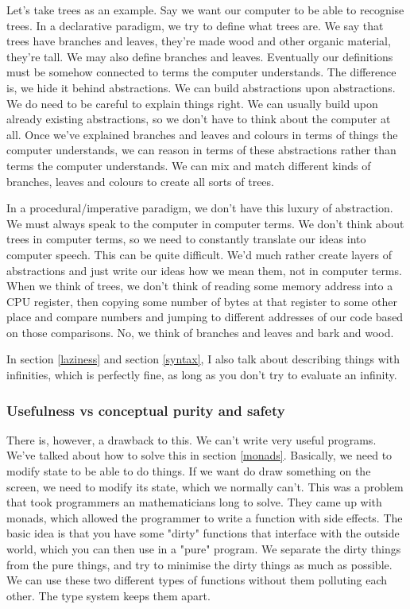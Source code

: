 \documentclass[11pt]{article}
\begin{document}
Let's take trees as an example. Say we want our computer to be able to
recognise trees. In a declarative paradigm, we try to define what trees are. We
say that trees have branches and leaves, they're made wood and other organic
material, they're tall. We may also define branches and leaves. Eventually our
definitions must be somehow connected to terms the computer understands. The
difference is, we hide it behind abstractions. We can build abstractions upon
abstractions. We do need to be careful to explain things right. We can usually
build upon already existing abstractions, so we don't have to think about the
computer at all. Once we've explained branches and leaves and colours in terms
of things the computer understands, we can reason in terms of these
abstractions rather than terms the computer understands. We can mix and match
different kinds of branches, leaves and colours to create all sorts of trees.

In a procedural/imperative paradigm, we don't have this luxury of abstraction.
We must always speak to the computer in computer terms. We don't think about
trees in computer terms, so we need to constantly translate our ideas into
computer speech. This can be quite difficult. We'd much rather create layers of
abstractions and just write our ideas how we mean them, not in computer terms.
When we think of trees, we don't think of reading some memory address into a
CPU register, then copying some number of bytes at that register to some other
place and compare numbers and jumping to different addresses of our code based
on those comparisons. No, we think of branches and leaves and bark and wood.

In section \ref{laziness} and section \ref{syntax}, I also talk about
describing things with infinities, which is perfectly fine, as long as you
don't try to evaluate an infinity.

\subsubsection{Usefulness vs conceptual purity and safety}\label{usefulness}

There is, however, a drawback to this. We can't write very useful programs.
We've talked about how to solve this in section \ref{monads}. Basically, we
need to modify state to be able to do things. If we want do draw something on
the screen, we need to modify its state, which we normally can't. This was a
problem that took programmers an mathematicians long to solve. They came up
with monads, which allowed the programmer to write a function with side
effects. The basic idea is that you have some "dirty" functions that interface
with the outside world, which you can then use in a "pure" program. We separate
the dirty things from the pure things, and try to minimise the dirty things as
much as possible. We can use these two different types of functions without
them polluting each other. The type system keeps them apart.
\end{document}
